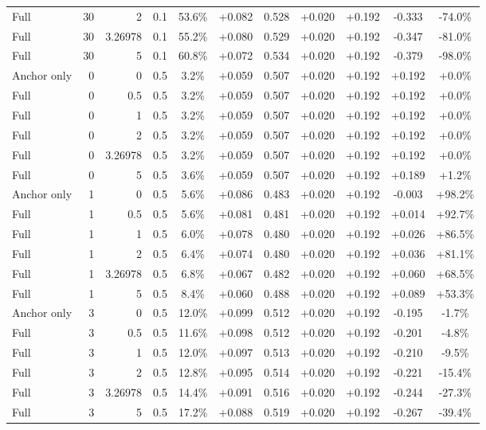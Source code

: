 \begin{table}[htbp]
\begin{tabular}{lrrrccccccc}
Full & 30 & 2 & 0.1 & 53.6\% & +0.082 & 0.528 & +0.020 & +0.192 & -0.333 & -74.0\% \\
Full & 30 & 3.26978 & 0.1 & 55.2\% & +0.080 & 0.529 & +0.020 & +0.192 & -0.347 & -81.0\% \\
Full & 30 & 5 & 0.1 & 60.8\% & +0.072 & 0.534 & +0.020 & +0.192 & -0.379 & -98.0\% \\
Anchor only & 0 & 0 & 0.5 & 3.2\% & +0.059 & 0.507 & +0.020 & +0.192 & +0.192 & +0.0\% \\
Full & 0 & 0.5 & 0.5 & 3.2\% & +0.059 & 0.507 & +0.020 & +0.192 & +0.192 & +0.0\% \\
Full & 0 & 1 & 0.5 & 3.2\% & +0.059 & 0.507 & +0.020 & +0.192 & +0.192 & +0.0\% \\
Full & 0 & 2 & 0.5 & 3.2\% & +0.059 & 0.507 & +0.020 & +0.192 & +0.192 & +0.0\% \\
Full & 0 & 3.26978 & 0.5 & 3.2\% & +0.059 & 0.507 & +0.020 & +0.192 & +0.192 & +0.0\% \\
Full & 0 & 5 & 0.5 & 3.6\% & +0.059 & 0.507 & +0.020 & +0.192 & +0.189 & +1.2\% \\
Anchor only & 1 & 0 & 0.5 & 5.6\% & +0.086 & 0.483 & +0.020 & +0.192 & -0.003 & +98.2\% \\
Full & 1 & 0.5 & 0.5 & 5.6\% & +0.081 & 0.481 & +0.020 & +0.192 & +0.014 & +92.7\% \\
Full & 1 & 1 & 0.5 & 6.0\% & +0.078 & 0.480 & +0.020 & +0.192 & +0.026 & +86.5\% \\
Full & 1 & 2 & 0.5 & 6.4\% & +0.074 & 0.480 & +0.020 & +0.192 & +0.036 & +81.1\% \\
Full & 1 & 3.26978 & 0.5 & 6.8\% & +0.067 & 0.482 & +0.020 & +0.192 & +0.060 & +68.5\% \\
Full & 1 & 5 & 0.5 & 8.4\% & +0.060 & 0.488 & +0.020 & +0.192 & +0.089 & +53.3\% \\
Anchor only & 3 & 0 & 0.5 & 12.0\% & +0.099 & 0.512 & +0.020 & +0.192 & -0.195 & -1.7\% \\
Full & 3 & 0.5 & 0.5 & 11.6\% & +0.098 & 0.512 & +0.020 & +0.192 & -0.201 & -4.8\% \\
Full & 3 & 1 & 0.5 & 12.0\% & +0.097 & 0.513 & +0.020 & +0.192 & -0.210 & -9.5\% \\
Full & 3 & 2 & 0.5 & 12.8\% & +0.095 & 0.514 & +0.020 & +0.192 & -0.221 & -15.4\% \\
Full & 3 & 3.26978 & 0.5 & 14.4\% & +0.091 & 0.516 & +0.020 & +0.192 & -0.244 & -27.3\% \\
Full & 3 & 5 & 0.5 & 17.2\% & +0.088 & 0.519 & +0.020 & +0.192 & -0.267 & -39.4\% \\

\end{tabular}
\end{table}
